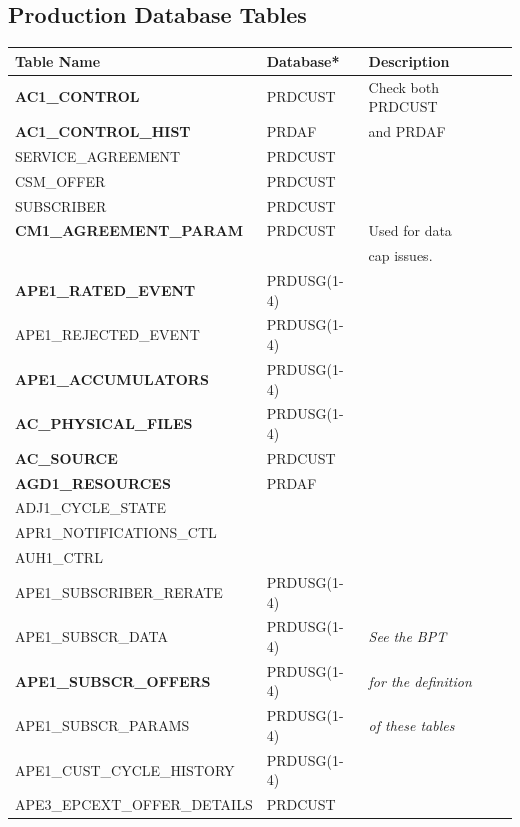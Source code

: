\documentclass[12pt,twoside]{article}
\begin{document}
\subsection{Production Database Tables}
\label{sec-8-3}

\scriptsize

\begin{center}
\begin{tabular}{lll}
\hline
 \textbf{Table Name}             &  Database*    &  Description                \\
\hline
 \textbf{AC1\_CONTROL}           &  PRDCUST      &  Check both PRDCUST         \\
 \textbf{AC1\_CONTROL\_HIST}     &  PRDAF        &  and PRDAF                  \\
 SERVICE\_AGREEMENT              &  PRDCUST      &                             \\
 CSM\_OFFER                      &  PRDCUST      &                             \\
 SUBSCRIBER                      &  PRDCUST      &                             \\
 \textbf{CM1\_AGREEMENT\_PARAM}  &  PRDCUST      &  Used for data              \\
                                 &               &  cap issues.                \\
 \textbf{APE1\_RATED\_EVENT}     &  PRDUSG(1-4)  &                             \\
 APE1\_REJECTED\_EVENT           &  PRDUSG(1-4)  &                             \\
 \textbf{APE1\_ACCUMULATORS}     &  PRDUSG(1-4)  &                             \\
 \textbf{AC\_PHYSICAL\_FILES}    &  PRDUSG(1-4)  &                             \\
 \textbf{AC\_SOURCE}             &  PRDCUST      &                             \\
 \textbf{AGD1\_RESOURCES}        &  PRDAF        &                             \\
 ADJ1\_CYCLE\_STATE              &               &                             \\
 APR1\_NOTIFICATIONS\_CTL        &               &                             \\
 AUH1\_CTRL                      &               &                             \\
 APE1\_SUBSCRIBER\_RERATE        &  PRDUSG(1-4)  &                             \\
 APE1\_SUBSCR\_DATA              &  PRDUSG(1-4)  &  \emph{See the BPT}         \\
 \textbf{APE1\_SUBSCR\_OFFERS}   &  PRDUSG(1-4)  &  \emph{for the definition}  \\
 APE1\_SUBSCR\_PARAMS            &  PRDUSG(1-4)  &  \emph{of these tables}     \\
 APE1\_CUST\_CYCLE\_HISTORY      &  PRDUSG(1-4)  &                             \\
 APE3\_EPCEXT\_OFFER\_DETAILS    &  PRDCUST      &                             \\
\hline
\end{tabular}
\end{center}
\end{document}
